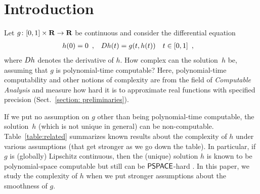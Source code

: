 \section{Introduction}

Let $g \colon [0,1] \times \mathbf R \to \mathbf R$ be continuous 
and consider the differential equation 
\begin{align}
 \label{eq:ode}
 h(0) & = 0 \enspace , &
 D h(t) & = g(t,h(t)) \quad t \in [0,1] \enspace , 
\end{align}
where $D h$ denotes the derivative of $h$. 
How complex can the solution~$h$ be, 
assuming that $g$ is polynomial-time computable? 
Here, polynomial-time computability 
and other notions of complexity 
are from the field of 
\emph{Computable Analysis} 
\cite{ko1991complexity,weihrauch00:_comput_analy}
and measure how hard it is to 
approximate real functions with specified precision 
(Sect.~\ref{section: preliminaries}). 

If we put no assumption on $g$ other than being polynomial-time computable, 
the solution~$h$ (which is not unique in general) can be non-computable. 
Table~\ref{table:related} summarizes known results about 
the complexity of $h$ under various assumptions 
(that get stronger as we go down the table). 
In particular, if $g$ is (globally) Lipschitz continuous, 
then the (unique) solution $h$ is known to be 
polynomial-space computable but still can be 
$\mathsf{PSPACE}$-hard \cite{kawamura2010lipschitz}. 
In this paper, we study the complexity of $h$ 
when we put stronger assumptions about 
the smoothness of $g$. 

